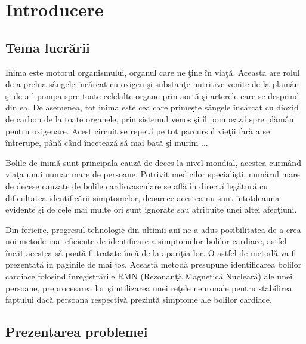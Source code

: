 \chapter{Introducere}

\section{Tema lucr\u{a}rii}

Inima este motorul organismului, organul care ne \c{t}ine \^{i}n via\c{t}\u{a}. Aceasta are rolul de a prelua s\^{a}ngele \^{i}nc\u{a}rcat cu oxigen \c{s}i substan\c{t}e nutritive venite de la plam\^{a}n \c{s}i de a-l pompa spre toate celelalte organe prin aort\u{a} \c{s}i arterele care se desprind din ea. De asemenea, tot inima este cea care prime\c{s}te s\^{a}ngele \^{i}nc\u{a}rcat cu dioxid de carbon de la toate organele, prin sistemul venos \c{s}i \^{i}l pompeaz\u{a} spre pl\u{a}m\^{a}ni pentru oxigenare. Acest circuit se repet\u{a} pe tot parcursul vie\c{t}ii far\u{a} a se \^{i}ntrerupe, p\^{a}n\u{a} c\^{a}nd \^{i}nceteaz\u{a} s\u{a} mai bat\u{a} \c{s}i murim ...
\par 
Bolile de inim\u{a} sunt principala cauz\u{a} de deces la nivel mondial, acestea curm\^{a}nd via\c{t}a unui numar mare de persoane. Potrivit medicilor speciali\c{s}ti, num\u{a}rul mare de decese cauzate de bolile cardiovasculare se afl\u{a} \^{i}n direct\u{a} leg\u{a}tur\u{a} cu dificultatea identific\u{a}rii simptomelor, deoarece acestea nu sunt \^{i}ntotdeauna evidente \c{s}i de cele mai multe ori sunt ignorate sau atribuite unei altei afec\c{t}iuni.
\par 
Din fericire, progresul tehnologic din ultimii ani ne-a adus posibilitatea de a crea noi metode mai eficiente de identificare a simptomelor bolilor cardiace, astfel \^{i}nc\^{a}t acestea s\u{a} poat\u{a} fi tratate \^{i}nc\u{a} de la apari\c{t}ia lor. O astfel de metod\u{a} va fi prezentat\u{a} \^{i}n paginile de mai jos. Aceast\u{a} metod\u{a} presupune identificarea bolilor cardiace folosind \^{i}nregistr\u{a}rile RMN (Rezonan\c{t}\u{a} Magnetic\u{a} Nuclear\u{a}) ale unei persoane, preprocesarea lor \c{s}i utilizarea unei re\c{t}ele neuronale pentru stabilirea faptului dac\u{a} persoana respectiv\u{a} prezint\u{a} simptome ale bolilor cardiace.

\section{Prezentarea problemei}

